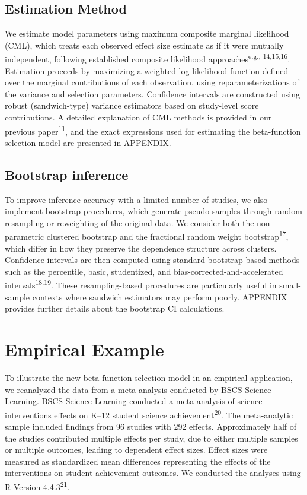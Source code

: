 \documentclass[
  american,
  man, donotrepeattitle,floatsintext]{apa7}
\begin{document}
\subsection{Estimation Method}\label{estimation-method}

We estimate model parameters using maximum composite marginal likelihood (CML), which treats each observed effect size estimate as if it were mutually independent, following established composite likelihood approaches\textsuperscript{e.g., 14,15,16}. Estimation proceeds by maximizing a weighted log-likelihood function defined over the marginal contributions of each observation, using reparameterizations of the variance and selection parameters. Confidence intervals are constructed using robust (sandwich-type) variance estimators based on study-level score contributions. A detailed explanation of CML methods is provided in our previous paper\textsuperscript{11}, and the exact expressions used for estimating the beta-function selection model are presented in APPENDIX.

\subsection{Bootstrap inference}\label{bootstrap-inference}

To improve inference accuracy with a limited number of studies, we also implement bootstrap procedures, which generate pseudo-samples through random resampling or reweighting of the original data. We consider both the non-parametric clustered bootstrap and the fractional random weight bootstrap\textsuperscript{17}, which differ in how they preserve the dependence structure across clusters. Confidence intervals are then computed using standard bootstrap-based methods such as the percentile, basic, studentized, and bias-corrected-and-accelerated intervals\textsuperscript{18,19}. These resampling-based procedures are particularly useful in small-sample contexts where sandwich estimators may perform poorly. APPENDIX provides further details about the bootstrap CI calculations.

\section{Empirical Example}\label{empirical-example}

To illustrate the new beta-function selection model in an empirical application, we reanalyzed the data from a meta-analysis conducted by BSCS Science Learning. BSCS Science Learning conducted a meta-analysis of science interventions effects on K--12 student science achievement\textsuperscript{20}. The meta-analytic sample included findings from 96 studies with 292 effects. Approximately half of the studies contributed multiple effects per study, due to either multiple samples or multiple outcomes, leading to dependent effect sizes. Effect sizes were measured as standardized mean differences representing the effects of the interventions on student achievement outcomes. We conducted the analyses using R Version 4.4.3\textsuperscript{21}.
\end{document}
